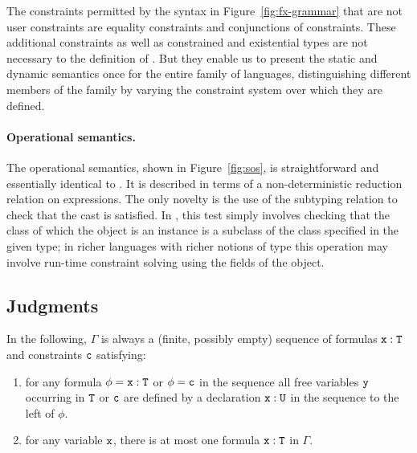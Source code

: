 The constraints permitted by the syntax in
Figure~\ref{fig:fx-grammar} that
are not user constraints are equality constraints and
conjunctions of constraints. These additional constraints as well as constrained and existential types
are not necessary to the definition of \FXZ.
But they enable us to present the static and dynamic
semantics once for the entire family of \FX{} languages,
distinguishing different members of the family by varying the
constraint system over which they are defined.

\paragraph{Operational semantics.}

The operational semantics, shown in Figure~\ref{fig:sos},
is straightforward and essentially identical
to \FJ \cite{FJ}. It is described in terms of a non-deterministic
reduction relation on expressions. The only novelty is the use of the
subtyping relation to check that the cast is satisfied. In \FXZ, this
test simply involves checking that the class of which the object is an
instance is a subclass of the class specified in the given type; in
richer languages with richer notions of type this operation may
involve run-time constraint solving using the fields of the object.


\subsection{Judgments}

In the following, $\Gamma$ is always a
(finite, possibly empty) sequence of formulas $\tt x:T$ and constraints $\tt c$ satisfying:
\begin{enumerate}
  \item for any formula $\phi=\tt x:T$ or $\phi=\tt c$ in the sequence all free variables $\tt y$
  occurring in $\tt T$ or $\tt c$ are defined by a declaration $\tt
  x:U$ in the sequence to the left of $\phi$.

  \item for any variable $\tt x$, there is at most one
  formula $\tt x:T$ in $\Gamma$.
\end{enumerate}

